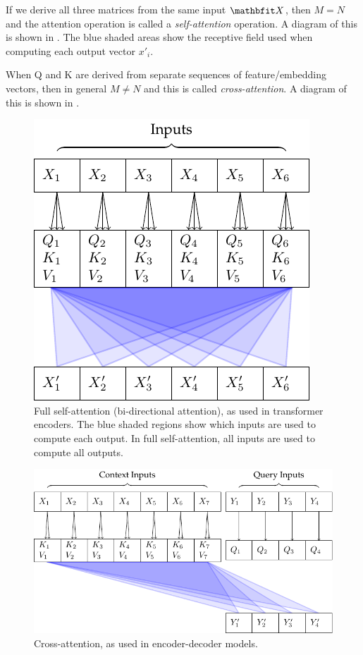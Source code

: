 If we derive all three matrices from the same input $\X$, then $M = N$ and the attention operation is called a \textit{self-attention} operation. A diagram of this is shown in . The blue shaded areas show the receptive field used when computing each output vector $x'_i$.

When Q and K are derived from separate sequences of feature/embedding vectors, then in general $M ≠ N$ and this is called \textit{cross-attention}. A diagram of this is shown in .

\begin{figure}
    \centering
    \includegraphics[]{figures/attn-1-self.pdf}
    \caption[Self-attention]{Full self-attention (bi-directional attention), as used in transformer encoders. The blue shaded regions show which inputs are used to compute each output. In full self-attention, all inputs are used to compute all outputs.}
    \label{fig:self-attn}
\end{figure}


\begin{figure}
    \centering
    \includegraphics[]{figures/attn-2-cross.pdf}
    \caption[Cross-attention]{Cross-attention, as used in encoder-decoder models.}
    \label{fig:cross-attn}
\end{figure}


